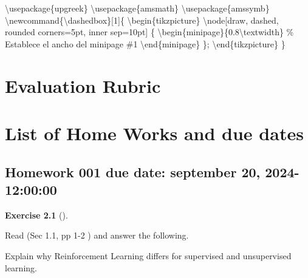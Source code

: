 \documentclass[
  letterpaper,
]{krantz}
\makeatletter
\newenvironment{Shaded}{\begin{snugshade}}{\end{snugshade}}
\newcommand{\BuiltInTok}[1]{\textcolor[rgb]{0.00,0.23,0.31}{#1}}
\newcommand{\CommentTok}[1]{\textcolor[rgb]{0.37,0.37,0.37}{#1}}
\newcommand{\ExtensionTok}[1]{\textcolor[rgb]{0.00,0.23,0.31}{#1}}
\newcommand{\FunctionTok}[1]{\textcolor[rgb]{0.28,0.35,0.67}{#1}}
\newcommand{\KeywordTok}[1]{\textcolor[rgb]{0.00,0.23,0.31}{#1}}
\newcommand{\NormalTok}[1]{\textcolor[rgb]{0.00,0.23,0.31}{#1}}
\newenvironment{kframe}{%
\medskip{}
\setlength{\fboxsep}{.8em}
 \def\at@end@of@kframe{}%
 \ifinner\ifhmode%
  \def\at@end@of@kframe{\end{minipage}}%
  \begin{minipage}{\columnwidth}%
 \fi\fi%
 \def\FrameCommand##1{\hskip\@totalleftmargin \hskip-\fboxsep
 \colorbox{shadecolor}{##1}\hskip-\fboxsep
     \hskip-\linewidth \hskip-\@totalleftmargin \hskip\columnwidth}%
 \MakeFramed {\advance\hsize-\width
   \@totalleftmargin\z@ \linewidth\hsize
   \@setminipage}}%
 {\par\unskip\endMakeFramed%
 \at@end@of@kframe}
\renewenvironment{Shaded}{\begin{kframe}}{\end{kframe}}
\theoremstyle{plain}
\theoremstyle{definition}
\theoremstyle{definition}
\newtheorem{exercise}{Exercise}[chapter]
\theoremstyle{remark}
\makeatother
\begin{document}
\begin{Shaded}
\begin{Highlighting}[]
\BuiltInTok{\textbackslash{}usepackage}\NormalTok{\{}\ExtensionTok{upgreek}\NormalTok{\}}
\BuiltInTok{\textbackslash{}usepackage}\NormalTok{\{}\ExtensionTok{amsmath}\NormalTok{\}}
\BuiltInTok{\textbackslash{}usepackage}\NormalTok{\{}\ExtensionTok{amssymb}\NormalTok{\}}
\FunctionTok{\textbackslash{}newcommand}\NormalTok{\{}\ExtensionTok{\textbackslash{}dashedbox}\NormalTok{\}[1]\{}
  \KeywordTok{\textbackslash{}begin}\NormalTok{\{}\ExtensionTok{tikzpicture}\NormalTok{\}}
    \FunctionTok{\textbackslash{}node}\NormalTok{[draw, dashed, rounded corners=5pt, inner sep=10pt] \{}
      \KeywordTok{\textbackslash{}begin}\NormalTok{\{}\ExtensionTok{minipage}\NormalTok{\}\{0.8}\FunctionTok{\textbackslash{}textwidth}\NormalTok{\} }\CommentTok{\% Establece el ancho del minipage}
\NormalTok{        \#1}
      \KeywordTok{\textbackslash{}end}\NormalTok{\{}\ExtensionTok{minipage}\NormalTok{\}}
\NormalTok{    \};}
  \KeywordTok{\textbackslash{}end}\NormalTok{\{}\ExtensionTok{tikzpicture}\NormalTok{\}}
\NormalTok{\}}
\end{Highlighting}
\end{Shaded}


\chapter{Evaluation Rubric}\label{evaluation-rubric}


\chapter{List of Home Works and due
dates}\label{list-of-home-works-and-due-dates}

\section{Homework 001 due date: september 20,
2024-12:00:00}\label{homework-001-due-date-september-20-2024-120000}

\begin{exercise}[]\protect\hypertarget{exr-hw_001_01}{}\label{exr-hw_001_01}

Read (Sec 1.1, pp 1-2 )
and answer the following.

Explain why Reinforcement Learning differs for supervised and
unsupervised learning.

\end{exercise}
\end{document}

